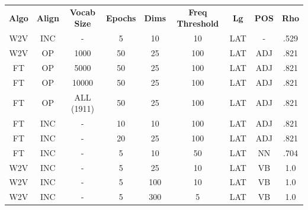 \begin{table}[h]
\centering
\begin{tabular}{ccccccccc} 
\toprule
\textbf{ Algo } & \textbf{ Align } & \textbf{ Vocab Size } & \textbf{ Epochs } & \textbf{ Dims } & \textbf{ Freq Threshold } & \textbf{ Lg } & \textbf{ POS } & \textbf{ Rho }  \\
W2V             & INC              & -                     & 5                 & 10              & 10                        & LAT           & -              & .529            \\
W2V             & OP               & 1000                  & 50                & 25              & 100                       & LAT           & ADJ            & .821            \\
FT              & OP               & 5000                  & 50                & 25              & 100                       & LAT           & ADJ            & .821            \\
FT              & OP               & 10000                 & 50                & 25              & 100                       & LAT           & ADJ            & .821            \\
FT              & OP               & ALL (1911)            & 50                & 25              & 100                       & LAT           & ADJ            & .821            \\
FT              & INC              & -                     & 10                & 10              & 100                       & LAT           & ADJ            & .821            \\
FT              & INC              & -                     & 20                & 25              & 100                       & LAT           & ADJ            & .821            \\
FT              & INC              & -                     & 5                 & 10              & 50                        & LAT           & NN             & .704            \\
W2V             & INC              & -                     & 5                 & 25              & 10                        & LAT           & VB             & 1.0             \\
W2V             & INC              & -                     & 5                 & 100             & 10                        & LAT           & VB             & 1.0             \\
W2V             & INC              & -                     & 5                 & 300             & 5                         & LAT           & VB             & 1.0             \\

\end{tabular}
\end{table}

